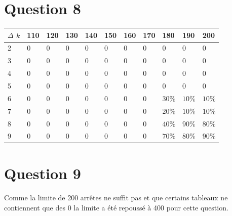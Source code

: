 \documentclass[11pt]{article}
\begin{document}
\section{Question 8}
\begin{tabular}{ | l | l | l | l | l | l | l | l | l | l | l |}
	\hline
	$\Delta$ $k$ & 110 & 120 & 130 & 140 & 150 & 160 & 170 & 180 & 190 & 200 \\ \hline
	2 & 0 & 0 & 0 & 0 & 0 & 0 & 0 & 0 & 0 & 0 \\ \hline
	3 & 0 & 0 & 0 & 0 & 0 & 0 & 0 & 0 & 0 & 0 \\ \hline
	4 & 0 & 0 & 0 & 0 & 0 & 0 & 0 & 0 & 0 & 0 \\ \hline
	5 & 0 & 0 & 0 & 0 & 0 & 0 & 0 & 0 & 0 & 0 \\ \hline
	6 & 0 & 0 & 0 & 0 & 0 & 0 & 0 & $30\%$ & $10\%$ & $10\%$  \\ \hline
	7 & 0 & 0 & 0 & 0 & 0 & 0 & 0 & $20\%$  & $10\%$  & $10\%$  \\ \hline
	8 & 0 & 0 & 0 & 0 & 0 & 0 & 0 & $40\%$  & $90\%$  & $80\%$  \\ \hline
	9 & 0 & 0 & 0 & 0 & 0 & 0 & 0 & $70\%$  & $80\%$  & $90\%$  \\ \hline
	
	\hline
\end{tabular}

\section{Question 9}
\paragraph{}
Comme la limite de 200 arrêtes ne suffit pas et que certains tableaux ne contiennent que des 0 la limite a
été repoussé à 400 pour cette question.
\end{document}
